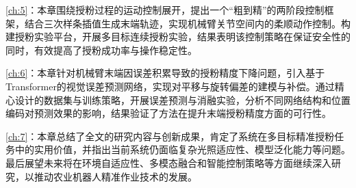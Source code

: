 \cref{ch:5}：本章围绕授粉过程的运动控制展开，提出一个“粗到精”的两阶段控制框架，结合三次样条插值生成末端轨迹，实现机械臂关节空间内的柔顺动作控制。构建授粉实验平台，开展多目标连续授粉实验，结果表明该控制策略在保证安全性的同时，有效提高了授粉成功率与操作稳定性。

\cref{ch:6}：本章针对机械臂末端因误差积累导致的授粉精度下降问题，引入基于Transformer的视觉误差预测网络，实现对平移与旋转偏差的建模与补偿。通过精心设计的数据集与训练策略，开展误差预测与消融实验，分析不同网络结构和位置编码对预测效果的影响，结果验证了方法在提升末端授粉精度方面的可行性。

\cref{ch:7}：本章总结了全文的研究内容与创新成果，肯定了系统在多目标精准授粉任务中的实用价值，并指出当前系统仍面临复杂光照适应性、模型泛化能力等问题。最后展望未来将在环境自适应性、多模态融合和智能控制策略等方面继续深入研究，以推动农业机器人精准作业技术的发展。


